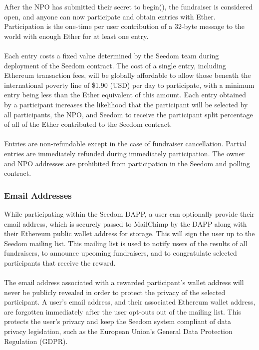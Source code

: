 \documentclass[11pt]{article}
\begin{document}
After the NPO has submitted their secret to begin(), the fundraiser is considered open, and anyone can now participate and obtain entries with Ether. Participation is the one-time per user contribution of a 32-byte message to the world with enough Ether for at least one entry.\\\\
Each entry costs a fixed value determined by the Seedom team during deployment of the Seedom contract. The cost of a single entry, including Ethereum transaction fees, will be globally affordable to allow those beneath the international poverty line of \$1.90 (USD) per day \cite{1} to participate, with a minimum entry being less than the Ether equivalent of this amount. Each entry obtained by a participant increases the likelihood that the participant will be selected by all participants, the NPO, and Seedom to receive the participant split percentage of all of the Ether contributed to the Seedom contract.\\\\
Entries are non-refundable except in the case of fundraiser cancellation. Partial entries are immediately refunded during immediately participation. The owner and NPO addresses are prohibited from participation in the Seedom and polling contract.

\subsubsection{Email Addresses}

While participating within the Seedom DAPP, a user can optionally provide their email address, which is securely passed to MailChimp by the DAPP along with their Ethereum public wallet address for storage. This will sign the user up to the Seedom mailing list. This mailing list is used to notify users of the results of all fundraisers, to announce upcoming fundraisers, and to congratulate selected participants that receive the reward.\\\\
The email address associated with a rewarded participant's wallet address will never be publicly revealed in order to protect the privacy of the selected participant. A user's email address, and their associated Ethereum wallet address, are forgotten immediately after the user opt-outs out of the mailing list. This protects the user's privacy and keep the Seedom system compliant of data privacy legislation, such as the European Union's General Data Protection Regulation (GDPR). 
\end{document}
